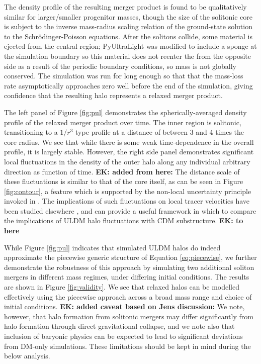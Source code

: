 \documentclass[a4paper,11pt]{article}
\newcommand{\ek}[1]{{{\bf \color{red} EK: #1}}}
\begin{document}
The density profile of the resulting merger product is found to be qualitatively similar for larger/smaller progenitor masses, though the size of the solitonic core is subject to the inverse mass-radius scaling relation of the ground-state solution to the Schr{\"o}dinger-Poisson equations. After the solitons collide, some material is ejected from the central region; {\sc PyUltraLight} was modified to include a sponge at the simulation boundary so this material does not  reenter the from the opposite side as a result of the periodic boundary conditions, so mass is not globally conserved. The simulation was run for long enough so that that the mass-loss rate asymptotically approaches zero well before the end of the simulation, giving confidence that the resulting halo represents a relaxed merger product. 

The left panel of Figure \ref{fig:pul} demonstrates the spherically-averaged density profile of the relaxed merger product over time. The inner region is solitonic, transitioning to a $1/r^3$ type profile at a distance of between 3 and 4 times the core radius. We see that while there is some weak time-dependence in the overall profile, it is largely stable. However, the right side panel demonstrates significant local fluctuations in the density of the outer halo along any individual arbitrary direction as function of time. \ek{added from here:} The distance scale of these fluctuations is similar to that of the core itself, as can be seen in Figure \ref{fig:contour}, a feature which is supported by the non-local uncertainty principle invoked in \cite{Schive:2014hza}. The implications of such fluctuations on local tracer velocities have been studied elsewhere \cite{Marsh:2018zyw}, and can provide a useful framework in which to compare the implications of ULDM halo fluctuations with CDM substructure. \ek{to here}

 
While Figure \ref{fig:pul} indicates that simulated ULDM halos do indeed approximate the piecewise generic structure of Equation \ref{eq:piecewise}, we further demonstrate the robustness of this approach by simulating two additional soliton mergers in different mass regimes, under differing initial conditions. The results are shown in Figure \ref{fig:validity}. We see that relaxed halos can be modelled effectively using the piecewise approach across a broad mass range and choice of initial conditions. \ek{added caveat based on Jens discussion:} We note, however, that halo formation from solitonic mergers may differ significantly from halo formation through direct gravitational collapse, and we note also that inclusion of baryonic physics can be expected to lead to significant deviations from DM-only simulations. These limitations should be kept in mind during the below analysis.
 
\end{document}
